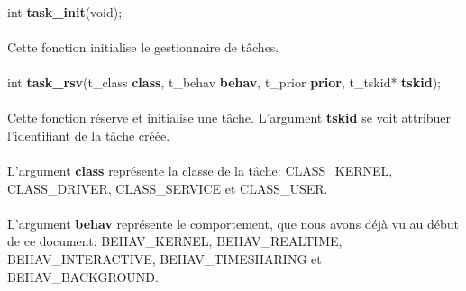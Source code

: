 \documentclass[10pt,a4wide]{article}
\begin{document}
\paragraph{}

\hspace{1.5cm}int \textbf{task\_init}(void);

\paragraph{}

Cette fonction initialise le gestionnaire de t\^aches.

\paragraph{}

\hspace{1.5cm}int \textbf{task\_rsv}(t\_class \textbf{class},
                                     t\_behav \textbf{behav},
                                     t\_prior \textbf{prior},
                                     t\_tskid* \textbf{tskid});

\paragraph{}

Cette fonction r\'eserve  et initialise une t\^ache. L'argument
\textbf{tskid} se voit attribuer l'identifiant de la t\^ache cr\'e\'ee.

\paragraph{}

L'argument \textbf{class} repr\'esente la classe de la t\^ache:
CLASS\_KERNEL, CLASS\_DRIVER, CLASS\_SERVICE et CLASS\_USER.

\paragraph{}

L'argument \textbf{behav} repr\'esente le comportement, que nous avons
d\'ej\`a vu au d\'ebut de ce document: BEHAV\_KERNEL, BEHAV\_REALTIME,
BEHAV\_INTERACTIVE, BEHAV\_TIMESHARING et BEHAV\_BACKGROUND.

\paragraph{}
\end{document}
